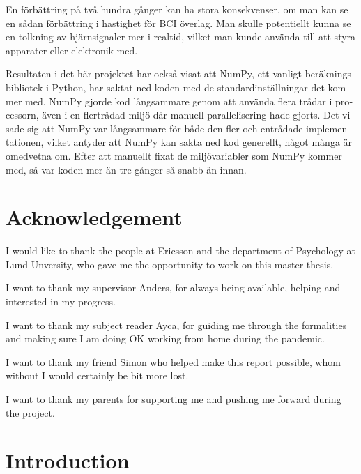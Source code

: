 \documentclass[12pt, a4paper]{article}
\begin{document}
\begin{otherlanguage}{swedish}
En förbättring på två hundra gånger kan ha stora konsekvenser, om man kan se en sådan förbättring i hastighet för BCI överlag.
Man skulle potentiellt kunna se en tolkning av hjärnsignaler mer i realtid, vilket man kunde använda till att styra apparater eller elektronik med.

Resultaten i det här projektet har också visat att NumPy, ett vanligt beräknings bibliotek i Python, har saktat ned koden med de standardinställningar det kommer med.
NumPy gjorde kod långsammare genom att använda flera trådar i processorn, även i en flertrådad miljö där manuell parallelisering hade gjorts.
Det visade sig att NumPy var långsammare för både den fler och entrådade implementationen, vilket antyder att NumPy kan sakta ned kod generellt, något många är omedvetna om.
Efter att manuellt fixat de miljövariabler som NumPy kommer med, så var koden mer än tre gånger så snabb än innan.

\end{otherlanguage}

\section*{Acknowledgement}

I would like to thank the people at Ericsson and the department of Psychology at Lund Unversity, who gave me the opportunity to work on this master thesis.

I want to thank my supervisor Anders, for always being available, helping and interested in my progress.

I want to thank my subject reader Ayca, for guiding me through the formalities and making sure I am doing OK working from home during the pandemic.

I want to thank my friend Simon who helped make this report possible, whom without I would certainly be bit more lost.

I want to thank my parents for supporting me and pushing me forward during the project.


\tableofcontents


\glsaddall
\renewcommand*{\arraystretch}{1.1}
\printglossary[type=main,style=long,nonumberlist]

\newpage

\section{Introduction}
\end{document}

